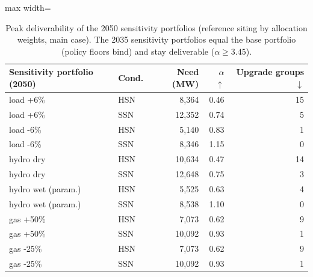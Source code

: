 \begin{table}[!htbp]
\centering
\scriptsize
\caption{Peak deliverability of the 2050 sensitivity portfolios (reference siting by allocation weights, main case). The 2035 sensitivity portfolios equal the base portfolio (policy floors bind) and stay deliverable ($\alpha\ge3.45$).}
\label{tab:sensdeliv}
\begin{adjustbox}{max width=\linewidth}
\begin{tabular}{llrrr}
\toprule
Sensitivity portfolio (2050) & Cond. & Need (MW) & $\alpha$ $\uparrow$ & Upgrade groups $\downarrow$ \\
\midrule
load +6\% & HSN & 8,364 & 0.46 & 15 \\
load +6\% & SSN & 12,352 & 0.74 & 5 \\
load -6\% & HSN & 5,140 & 0.83 & 1 \\
load -6\% & SSN & 8,346 & 1.15 & 0 \\
hydro dry & HSN & 10,634 & 0.47 & 14 \\
hydro dry & SSN & 12,648 & 0.75 & 3 \\
hydro wet (param.) & HSN & 5,525 & 0.63 & 4 \\
hydro wet (param.) & SSN & 8,538 & 1.10 & 0 \\
gas +50\% & HSN & 7,073 & 0.62 & 9 \\
gas +50\% & SSN & 10,092 & 0.93 & 1 \\
gas -25\% & HSN & 7,073 & 0.62 & 9 \\
gas -25\% & SSN & 10,092 & 0.93 & 1 \\
\bottomrule
\end{tabular}
\end{adjustbox}
\end{table}

